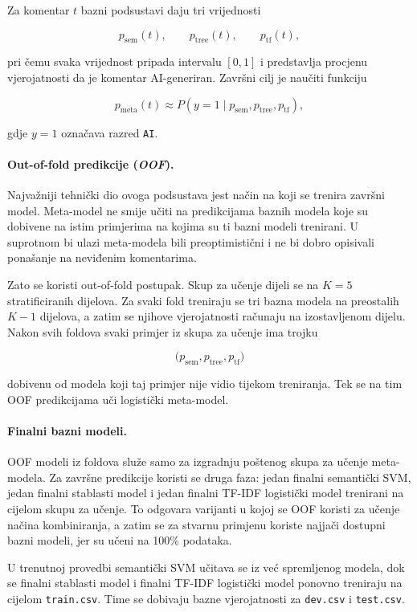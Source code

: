 \documentclass{article}
\begin{document}
Za komentar $t$ bazni podsustavi daju tri vrijednosti

\[
p_{\mathrm{sem}}(t),
\qquad
p_{\mathrm{tree}}(t),
\qquad
p_{\mathrm{tf}}(t),
\]

pri čemu svaka vrijednost pripada intervalu $[0,1]$ i predstavlja procjenu vjerojatnosti da je komentar AI-generiran. Završni cilj je naučiti funkciju

\[
p_{\mathrm{meta}}(t) \approx P(y=1\mid p_{\mathrm{sem}},p_{\mathrm{tree}},p_{\mathrm{tf}}),
\]

gdje $y=1$ označava razred \texttt{AI}.

\paragraph{Out-of-fold predikcije (\textit{OOF}).}
Najvažniji tehnički dio ovoga podsustava jest način na koji se trenira završni model. Meta-model ne smije učiti na predikcijama baznih modela koje su dobivene na istim primjerima na kojima su ti bazni modeli trenirani. U suprotnom bi ulazi meta-modela bili preoptimistični i ne bi dobro opisivali ponašanje na neviđenim komentarima.

Zato se koristi out-of-fold postupak. Skup za učenje dijeli se na $K=5$ stratificiranih dijelova. Za svaki fold treniraju se tri bazna modela na preostalih $K-1$ dijelova, a zatim se njihove vjerojatnosti računaju na izostavljenom dijelu. Nakon svih foldova svaki primjer iz skupa za učenje ima trojku

\[
\bigl(p_{\mathrm{sem}},p_{\mathrm{tree}},p_{\mathrm{tf}}\bigr)
\]

dobivenu od modela koji taj primjer nije vidio tijekom treniranja. Tek se na tim OOF predikcijama uči logistički meta-model.

\paragraph{Finalni bazni modeli.}
OOF modeli iz foldova služe samo za izgradnju poštenog skupa za učenje meta-modela. Za završne predikcije koristi se druga faza: jedan finalni semantički SVM, jedan finalni stablasti model i jedan finalni TF-IDF logistički model trenirani na cijelom skupu za učenje. To odgovara varijanti u kojoj se OOF koristi za učenje načina kombiniranja, a zatim se za stvarnu primjenu koriste najjači dostupni bazni modeli, jer su učeni na 100\% podataka.

U trenutnoj provedbi semantički SVM učitava se iz već spremljenog modela, dok se finalni stablasti model i finalni TF-IDF logistički model ponovno treniraju na cijelom \texttt{train.csv}. Time se dobivaju bazne vjerojatnosti za \texttt{dev.csv} i \texttt{test.csv}.
\end{document}
